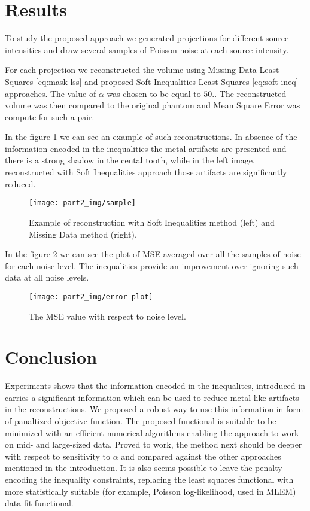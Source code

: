 \section{Results}
\label{s-results}
To study the proposed approach we generated projections for different source intensities and draw several samples of Poisson noise at each source intensity.

For each projection we reconstructed the volume using Missing Data Least Squares \eqref{eq:mask-lss} and proposed Soft Inequalities Least Squares \eqref{eq:soft-ineq} approaches. The value of $\alpha$ was chosen to be equal to $50$.. The reconstructed volume was then compared to the original phantom and Mean Square Error was compute for such a pair.

In the figure \ref{sample} we can see an example of such reconstructions. In absence of the information encoded in the inequalities the metal artifacts are presented and there is a strong shadow in the cental tooth, while in the left image, reconstructed with Soft Inequalities approach those artifacts are significantly reduced.
\begin{figure}
  \centering
  \texttt{[image: part2\_img/sample]}
  \caption{Example of reconstruction with Soft Inequalities method (left)
    and Missing Data method (right).}
  \label{sample}
\end{figure}
In the figure \ref{error-plot} we can see the plot of MSE averaged over all the samples of noise for each noise level. The inequalities provide an improvement over ignoring such data at all noise levels.
\begin{figure}
  \centering
  \texttt{[image: part2\_img/error-plot]}
  \caption{The MSE value with respect to noise level.}
  \label{error-plot}
\end{figure}

\section{Conclusion}
\label{s-conclusion}

Experiments shows that the information encoded in the inequalites, introduced in \cite{chukalinaway} carries a significant information which can be used to reduce metal-like artifacts in the reconstructions. We proposed a robust way to use this information in form of panaltized objective function. The proposed functional is suitable to be minimized with an efficient numerical algorithms enabling the approach to work on mid- and large-sized data. Proved to work, the method next should be deeper with respect to sensitivity to $\alpha$ and compared against the other approaches mentioned in the introduction. It is also seems possible to leave the penalty encoding the inequality constraints, replacing the least squares functional with more statistically suitable (for example, Poisson log-likelihood, used in MLEM) data fit functional.

